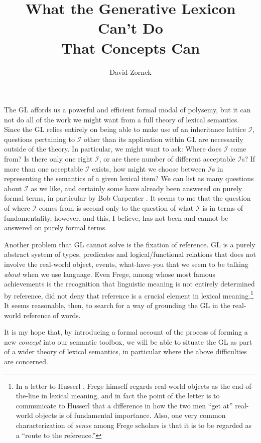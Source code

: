 \documentclass[12pt]{amsart}
\title{What the Generative Lexicon Can't Do \\ That Concepts Can}
\author{David Zornek}
\date{} %
\begin{document}
\maketitle

The GL affords us a powerful and efficient formal modal of polysemy, but it can not do all of the work we might want from a full theory of lexical semantics. Since the GL relies entirely on being able to make use of an inheritance lattice $\mathcal{I}$, questions pertaining to $\mathcal{I}$ other than its application within GL are necessarily outside of the theory. In particular, we might want to ask: Where does $\mathcal{I}$ come from? Is there only one right $\mathcal{I}$, or are there number of different acceptable $\mathcal{I}$s? If more than one acceptable $\mathcal{I}$ exists, how might we choose between $\mathcal{I}$s in representing the semantics of a given lexical item? We can list as many questions about $\mathcal{I}$ as we like, and certainly some have already been answered on purely formal terms, in particular by Bob Carpenter \cite{Carpenter92}. It seems to me that the question of where $\mathcal{I}$ comes from is second only to the question of what $\mathcal{I}$ is in terms of fundamentality, however, and this, I believe, has not been and cannot be answered on purely formal terms.

Another problem that GL cannot solve is the fixation of reference. GL is a purely abstract system of types, predicates and logical/functional relations that does not involve the real-world object, events, what-have-you that we seem to be talking \emph{about} when we use language. Even Frege, among whose most famous achievements is the recognition that linguistic meaning is not entirely determined by reference, did not deny that reference is a crucial element in lexical meaning.\footnote{In a letter to Husserl \cite{Frege1891}, Frege himself regards real-world objects as the end-of-the-line in lexical meaning, and in fact the point of the letter is to communicate to Husserl that a difference in how the two men ``get at'' real-world objects is of fundamental importance. Also, one very common characterization of \emph{sense} among Frege scholars is that it is to be regarded as a ``route to the reference.''} It seems reasonable, then, to search for a way of grounding the GL in the real-world reference of words.

It is my hope that, by introducing a formal account of the process of forming a new \emph{concept} into our semantic toolbox, we will be able to situate the GL as part of a wider theory of lexical semantics, in particular where the above difficulties are concerned.
\end{document}
